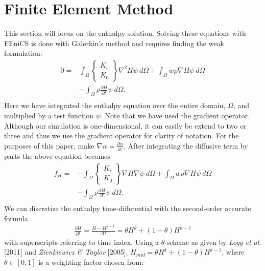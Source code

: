 \documentclass{article}%
\begin{document}
\section{Finite Element Method}

This section will focus on the enthalpy solution.  Solving these equations with FEniCS is done with Galerkin's method and requires finding the weak formulation:
\begin{align*}
    0 =
    &\int_{\Omega} 
      \begin{Bmatrix}
        K_i\\
        K_0
      \end{Bmatrix}
      \nabla^2 H \psi\ d \Omega 
    + \int_{\Omega}w \rho \nabla H \psi\ d \Omega \\
    &- \int_{\Omega} {\rho \frac{\partial H}{\partial t}} \psi\ d \Omega. \\
\end{align*}
Here we have integrated the enthalpy equation over the entire domain, $\Omega$, and multiplied by a test function $\psi$.  Note that we have used the gradient operator.  Although our simulation is one-dimensional, it can easily be extend to two or three and thus we use the gradient operator for clarity of notation.  For the purposes of this paper, make $\nabla{\alpha} = \frac{\partial \alpha}{\partial z}$.  After integrating the diffusive term by parts the above equation becomes
\begin{align*}
    f_H =
    &- \int_{\Omega} 
        \begin{Bmatrix}
          K_i\\
          K_0
        \end{Bmatrix}
        \nabla H \nabla \psi\ d \Omega 
    + \int_{\Omega}w \rho \nabla H \psi\ d \Omega \\
    &- \int_{\Omega} {\rho \frac{\partial H}{\partial t}} \psi\ d \Omega. \\
\end{align*}
We can discretize the enthalpy time-differential with the second-order accurate formula
\begin{align*}
  \frac{\partial H}{\partial t} = \frac{H - H^{k-1}}{\Delta t} = \theta H^{k}  + (1-\theta) H^{k-1}
\end{align*}
with superscripts referring to time index.  Using a $\theta$-scheme as given by \emph{Logg et al.} [2011] and \emph{Zienkiewicz \& Taylor} [2005], $H_{mid} = \theta H^{k}  + (1-\theta) H^{k-1}$, where $\theta \in [0,1]$ is a weighting factor chosen from: 
\end{document}
